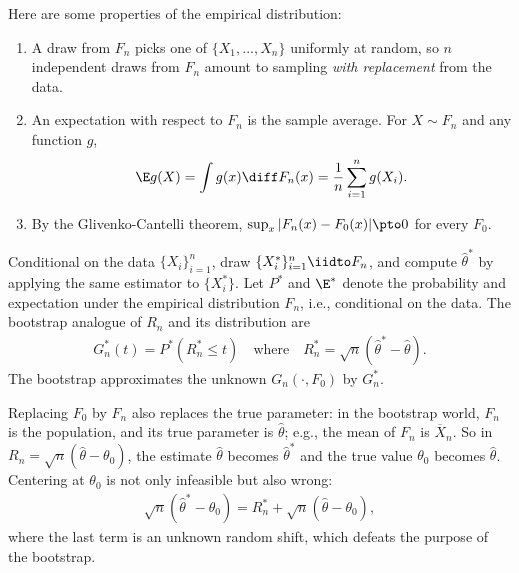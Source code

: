 \documentclass[a4paper,12pt]{article}
\begin{document}
\begin{remark}[Properties]
	Here are some properties of the empirical distribution:
	\begin{enumerate}
		\item
			A draw from $F_n$ picks one of $\{X_1,...,X_n\}$ uniformly at random,
			so $n$ independent draws from $F_n$ amount to sampling \emph{with replacement} from the data.
		\item
			An expectation with respect to $F_n$ is the sample average.
			For $X\sim F_n$ and any function $g$,
			\begin{align}
				\E g(X)=\int g(x)\diff F_n(x)=\frac1n\sum_{i=1}^ng(X_i).
			\end{align}
		\item
			By the Glivenko-Cantelli theorem, $\sup_x|F_n(x)-F_0(x)|\pto0$ for every $F_0$.
	\end{enumerate}
\end{remark}

\begin{definition}
	Conditional on the data $\{X_i\}_{i=1}^{n}$,
	draw $\{X_i^*\}_{i=1}^{n}\iidto F_n$,
	and compute $\widehat\theta^*$ by applying the same estimator to $\{X_i^*\}$.
	Let $P^*$ and $\E^*$ denote the probability and expectation under the empirical distribution $F_n$, i.e., conditional on the data.
	The bootstrap analogue of $R_n$ and its distribution are
	\begin{align}
		G_n^*(t)=P^*(R_n^*\le t)
		\quad\text{where}\quad
		R_n^*=\sqrt n(\widehat\theta^*-\widehat\theta).
	\end{align}
	The bootstrap approximates the unknown $G_n(\cdot,F_0)$ by $G_n^*$.
\end{definition}

\begin{remark}[Centering]
	Replacing $F_0$ by $F_n$ also replaces the true parameter:
	in the bootstrap world, $F_n$ is the population, and its true parameter is $\widehat\theta$;
	e.g., the mean of $F_n$ is $\overline X_n$.
	So in $R_n=\sqrt n(\widehat\theta-\theta_0)$, the estimate $\widehat\theta$ becomes $\widehat\theta^*$ and the true value $\theta_0$ becomes $\widehat\theta$.
	Centering at $\theta_0$ is not only infeasible but also wrong:
	\begin{align}
		\sqrt n(\widehat\theta^*-\theta_0)=R_n^*+\sqrt n(\widehat\theta-\theta_0),
	\end{align}
	where the last term is an unknown random shift,
	which defeats the purpose of the bootstrap.
\end{remark}
\end{document}
